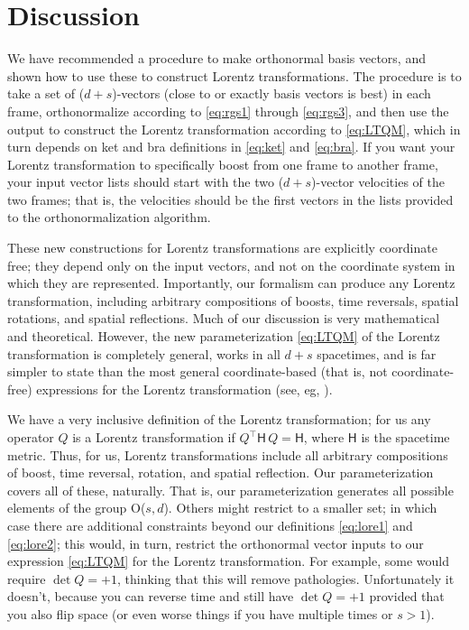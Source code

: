 \documentclass{article}
\newcommand{\metric}{\mathsf{H}}
\newcommand{\plus}{\!+\!} %
\begin{document}
\section{Discussion}\label{sec:discussion}

We have recommended a procedure to make orthonormal basis vectors, and shown how to use these to construct Lorentz transformations.
The procedure is to take a set of ($d\plus s$)-vectors (close to or exactly basis vectors is best) in each frame, orthonormalize according to \eqref{eq:rgs1} through \eqref{eq:rgs3}, and then use the output to construct the Lorentz transformation according to \eqref{eq:LTQM}, which in turn depends on ket and bra definitions in \eqref{eq:ket} and \eqref{eq:bra}.
If you want your Lorentz transformation to specifically boost from one frame to another frame, your input vector lists should start with the two ($d\plus s$)-vector velocities of the two frames; that is, the velocities should be the first vectors in the lists provided to the orthonormalization algorithm.

These new constructions for Lorentz transformations are explicitly coordinate free; they depend only on the input vectors, and not on the coordinate system in which they are represented.
Importantly, our formalism can produce any Lorentz transformation, including arbitrary compositions of boosts, time reversals, spatial rotations, and spatial reflections.
Much of our discussion is very mathematical and theoretical.
However, the new parameterization \eqref{eq:LTQM} of the Lorentz transformation is completely general, works in all $d+s$ spacetimes, and is far simpler to state than the most general coordinate-based (that is, not coordinate-free) expressions for the Lorentz transformation (see, eg, \cite{haber}).

We have a very inclusive definition of the Lorentz transformation; for us any operator $Q$ is a Lorentz transformation if $Q^\top\metric\,Q=\metric$, where $\metric$ is the spacetime metric.
Thus, for us, Lorentz transformations include all arbitrary compositions of boost, time reversal, rotation, and spatial reflection.
Our parameterization covers all of these, naturally.
That is, our parameterization generates all possible elements of the group O($s,d$).
Others might restrict to a smaller set; in which case there are additional constraints beyond our definitions \eqref{eq:lore1} and \eqref{eq:lore2}; this would, in turn, restrict the orthonormal vector inputs to our expression \eqref{eq:LTQM} for the Lorentz transformation.
For example, some would require $\det Q = +1$, thinking that this will remove pathologies.
Unfortunately it doesn't, because you can reverse time and still have $\det Q = +1$ provided that you also flip space (or even worse things if you have multiple times or $s>1$).
\end{document}
